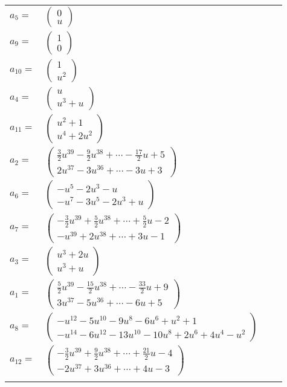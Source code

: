 \documentclass[1p]{elsarticle_modified}
\theoremstyle{definition}
\begin{document}
\begin{tabular}{m{7pt} m{180pt} m{7pt} m{180pt} }
\flushright $a_{5}=$&$\begin{pmatrix}0\\u\end{pmatrix}$ \\
\flushright $a_{9}=$&$\begin{pmatrix}1\\0\end{pmatrix}$ \\
\flushright $a_{10}=$&$\begin{pmatrix}1\\u^2\end{pmatrix}$ \\
\flushright $a_{4}=$&$\begin{pmatrix}u\\u^3+u\end{pmatrix}$ \\
\flushright $a_{11}=$&$\begin{pmatrix}u^2+1\\u^4+2 u^2\end{pmatrix}$ \\
\flushright $a_{2}=$&$\begin{pmatrix}\frac{3}{2} u^{39}-\frac{9}{2} u^{38}+\cdots-\frac{17}{2} u+5\\2 u^{37}-3 u^{36}+\cdots-3 u+3\end{pmatrix}$ \\
\flushright $a_{6}=$&$\begin{pmatrix}- u^5-2 u^3- u\\- u^7-3 u^5-2 u^3+u\end{pmatrix}$ \\
\flushright $a_{7}=$&$\begin{pmatrix}-\frac{3}{2} u^{39}+\frac{5}{2} u^{38}+\cdots+\frac{5}{2} u-2\\- u^{39}+2 u^{38}+\cdots+3 u-1\end{pmatrix}$ \\
\flushright $a_{3}=$&$\begin{pmatrix}u^3+2 u\\u^3+u\end{pmatrix}$ \\
\flushright $a_{1}=$&$\begin{pmatrix}\frac{5}{2} u^{39}-\frac{15}{2} u^{38}+\cdots-\frac{33}{2} u+9\\3 u^{37}-5 u^{36}+\cdots-6 u+5\end{pmatrix}$ \\
\flushright $a_{8}=$&$\begin{pmatrix}- u^{12}-5 u^{10}-9 u^8-6 u^6+u^2+1\\- u^{14}-6 u^{12}-13 u^{10}-10 u^8+2 u^6+4 u^4- u^2\end{pmatrix}$ \\
\flushright $a_{12}=$&$\begin{pmatrix}-\frac{3}{2} u^{39}+\frac{9}{2} u^{38}+\cdots+\frac{21}{2} u-4\\-2 u^{37}+3 u^{36}+\cdots+4 u-3\end{pmatrix}$\\&\end{tabular}
\end{document}
